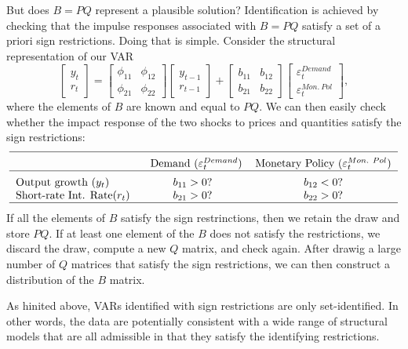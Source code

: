 \documentclass[10pt]{article}
\begin{document}
But does $B=PQ$ represent a plausible solution? Identification is achieved
by checking that the impulse responses associated with $B=PQ$ satisfy a set
of a priori sign restrictions. Doing that is simple. Consider the structural
representation of our VAR%
\begin{equation}
\left[
\begin{array}{c}
y_{t} \\
r_{t}%
\end{array}%
\right] =%
\begin{bmatrix}
\phi _{11} & \phi _{12} \\
\phi _{21} & \phi _{22}%
\end{bmatrix}%
\left[
\begin{array}{c}
y_{t-1} \\
r_{t-1}%
\end{array}%
\right] +\left[
\begin{array}{cc}
b_{11} & b_{12} \\
b_{21} & b_{22}%
\end{array}%
\right]
\begin{bmatrix}
\varepsilon _{t}^{Demand} \\
\varepsilon _{t}^{Mon.\ Pol}%
\end{bmatrix}%
,  \label{eq:struct_var_sr}
\end{equation}%
where the elements of $B$ are known and equal to $PQ$. We can then easily
check whether the impact response of the two shocks to prices and quantities
satisfy the sign restrictions:%
\begin{equation*}
\begin{tabular}{lcc}
\hline
\addlinespace & $\text{Demand}$ ($\varepsilon _{t}^{Demand}$) & Monetary
Policy ($\varepsilon _{t}^{Mon.\ Pol}$) \\ \hline
\addlinespace Output growth ($y_{t}$) & $b_{11}>0$? & $b_{12}<0$? \\
Short-rate Int. Rate($r_{t}$) & $b_{21}>0$? & $b_{22}>0$? \\ \hline
\end{tabular}%
\end{equation*}%
If all the elements of $B$ satisfy the sign restrinctions, then we retain
the draw and store $PQ$. If at least one element of the $B$ does not satisfy
the restrictions, we discard the draw, compute a new $Q$ matrix, and check
again. After drawig a large number of $Q$ matrices that satisfy the sign
restrictions, we can then construct a distribution of the $B$ matrix.

As hinited above, VARs identified with sign restrictions are only
set-identified. In other words, the data are potentially consistent with a
wide range of structural models that are all admissible in that they satisfy
the identifying restrictions.
\end{document}
